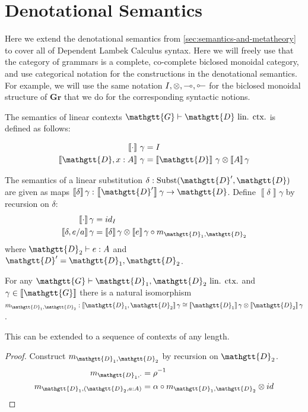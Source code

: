 \documentclass[acmsmall,nonacm]{acmart}
\renewcommand{\Gamma}{\mathgtt{G}}
\renewcommand{\Delta}{\mathgtt{D}}
\newcommand{\sem}[1]{\left\llbracket{#1}\right\rrbracket}
\newcommand{\semg}[1]{\sem{#1}\gamma}
\newcommand{\lto}{\multimap}
\newcommand{\tol}{\mathrel{\rotatebox[origin=c]{180}{$\lto$}}}
\newcommand{\Grammar}{\mathbf{Gr}}
\newcommand{\theoryname}{Dependent Lambek Calculus\xspace}
\newcommand{\isLinCtx}{\textrm{ lin. ctx.}}
\newif\ifdraft
\renewcommand{\max}[1]{\ifdraft{\color{blue}[{\bf Max says}: #1]}\fi}
\begin{document}
\section{Denotational Semantics}
\label{sec:denotational}
Here we extend the denotational semantics from
\cref{sec:semantics-and-metatheory} to cover all of \theoryname
syntax. Here we will freely use that the category of grammars is a
complete, co-complete biclosed monoidal category, and use categorical
notation for the constructions in the denotational semantics. For
example, we will use the same notation $I,\otimes,\lto,\tol$ for the
biclosed monoidal structure of $\Grammar$ that we do for the
corresponding syntactic notions.

\begin{definition}
  The semantics of linear contexts $\Gamma \vdash \Delta \isLinCtx$ is
  defined as follows:
  \max{make sure this aligns with our interpretation of $\lto$/$\tol$}
  \begin{align*}
    \sem{\cdot}\,\gamma &= I \\
    \sem{\Delta,x:A}\,\gamma &= \sem{\Delta}\,\gamma \otimes \sem{A}\gamma \\
  \end{align*}
\end{definition}

\begin{definition}
  The semantics of a linear substitution
  $\delta : \textrm{Subst}(\Delta' , \Delta)$ are given as maps
  $\semg{\delta} : \semg{\Delta'} \to {\Delta}$. Define $\semg{\delta}$ by
  recursion on $\delta$:
  \begin{align*}
    \semg{\cdot} &= id_{I} \\
    \semg{\delta,e/a} &= \semg{\delta} \otimes \semg{e} \circ m_{\Delta_{1},\Delta_{2}}
  \end{align*}
where $\Delta_{2} \vdash e : A$ and $\Delta' = \Delta_{1},\Delta_{2}$.
\end{definition}

\begin{theorem}
  For any $\Gamma \vdash \Delta_1,\Delta_2 \isLinCtx$ and $\gamma \in
  \sem{\Gamma}$ there is a natural isomorphism $m_{\Delta_1,\Delta_2} :
  \sem{\Delta_1, \Delta_2}\gamma \cong \sem{\Delta_1}\gamma \otimes
  \sem{\Delta_2}\gamma$.

  This can be extended to a sequence of contexts of any length.
\end{theorem}
\begin{proof}
Construct $m_{\Delta_{1},\Delta_{2}}$ by recursion on $\Delta_{2}$.
\begin{align*}
  m_{\Delta_{1},\cdot} & = \rho^{-1} \\
  m_{\Delta_{1},(\Delta_{2}, a : A)} & = \alpha \circ m_{\Delta_{1},\Delta_{2}} \otimes id
\end{align*}
\end{proof}
\end{document}
